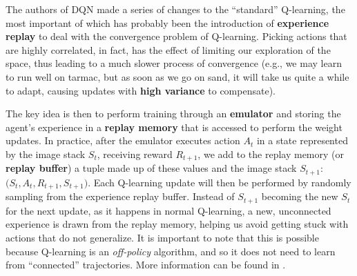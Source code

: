 The authors of DQN made a series of changes to the ``standard'' Q-learning, the most important of which has probably been the introduction of \textbf{experience replay} to deal with the convergence problem of Q-learning. Picking actions that are highly correlated, in fact, has the effect of limiting our exploration of the space, thus leading to a much slower process of convergence (e.g., we may learn to run well on tarmac, but as soon as we go on sand, it will take us quite a while to adapt, causing updates with \textbf{high variance} to compensate).

The key idea is then to perform training through an \textbf{emulator} and storing the agent’s experience in a \textbf{replay memory} that is accessed to perform the weight updates. In practice, after the emulator executes action $A_t$ in a state represented by the image stack $S_t$, receiving reward $R_{t+1}$, we add to the replay memory (or \textbf{replay buffer}) a tuple made up of these values and the image stack $S_{t+1}$: $\big(S_t,A_t,R_{t+1},S_{t+1}\big)$. Each Q-learning update will then be performed by randomly sampling from the experience replay buffer. Instead of $S_{t+1}$ becoming the new $S_t$ for the next update, as it happens in normal Q-learning, a new, unconnected experience is drawn from the replay memory, helping us avoid getting stuck with actions that do not generalize. It is important to note that this is possible because Q-learning is an \textit{off-policy} algorithm, and so it does not need to learn from ``connected'' trajectories. More information can be found in \cite{10.1007/BF00992699}.